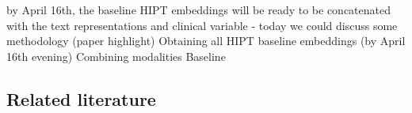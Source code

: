 \documentclass{article}%
\begin{document}
\newline%
\newline%
%
by April 16th, the baseline HIPT embeddings will be ready to be concatenated with the text representations and clinical variable%
\newline%
\newline%
%
{-} today we could discuss some methodology (paper highlight)%
\newline%
\newline%
%
Obtaining all HIPT baseline embeddings (by April 16th evening)%
\newline%
\newline%
%
Combining modalities %
\newline%
\newline%
%
Baseline %
\newline%
\newline%
%
\subsection{Related literature}%
\label{subsec:Relatedliterature}%
\end{document}
